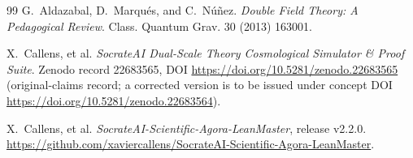 \documentclass[11pt,a4paper]{article}
\begin{document}
\begin{thebibliography}{99}
G.~Aldazabal, D.~Marqu\'es, and C.~N\'u\~nez.
\textit{Double Field Theory: A Pedagogical Review}.
Class. Quantum Grav. 30 (2013) 163001.

X.~Callens, et al.
\textit{SocrateAI Dual-Scale Theory Cosmological Simulator \& Proof Suite}.
Zenodo record 22683565, DOI \url{https://doi.org/10.5281/zenodo.22683565} (original-claims record; a
corrected version is to be issued under concept DOI \url{https://doi.org/10.5281/zenodo.22683564}).

X.~Callens, et al.
\textit{SocrateAI-Scientific-Agora-LeanMaster}, release v2.2.0.
\url{https://github.com/xaviercallens/SocrateAI-Scientific-Agora-LeanMaster}.

\end{thebibliography}
\end{document}
